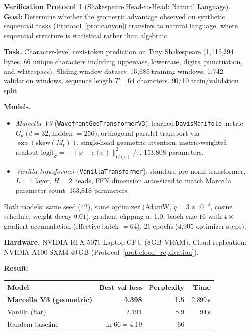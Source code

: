 \documentclass[11pt,a4paper]{article}
\theoremstyle{definition}
\newtheorem{protocol}[theorem]{Verification Protocol}
\theoremstyle{remark}
\begin{document}
\begin{protocol}[Shakespeare Head-to-Head: Natural Language]\label{prot:shakespeare}
\textbf{Goal:} Determine whether the geometric advantage observed on 
synthetic sequential tasks (Protocol~\ref{prot:canyon}) transfers to 
natural language, where sequential structure is statistical rather 
than algebraic.

\textbf{Task.} Character-level next-token prediction on Tiny 
Shakespeare (1{,}115{,}394 bytes, 66 unique characters including 
uppercase, lowercase, digits, punctuation, and whitespace). 
Sliding-window dataset: 15{,}685 training windows, 1{,}742 
validation windows, sequence length $T = 64$ characters. 
90/10 train/validation split.

\textbf{Models.}
\begin{itemize}[nosep]
  \item \emph{Marcella V3} (\texttt{WavefrontGeoTransformerV3}): 
  learned \texttt{DavisManifold} metric $G_\theta$ ($d = 32$, 
  hidden $= 256$), orthogonal parallel transport via 
  $\exp(\mathrm{skew}(M_t))$, single-head geometric attention, 
  metric-weighted readout 
  $\mathrm{logit}_\sigma = -\|x - e(\sigma)\|^2_{G(x)} / \tau$. 
  153{,}808 parameters.
  \item \emph{Vanilla transformer} 
  (\texttt{VanillaTransformer}): standard pre-norm transformer, 
  $L = 1$ layer, $H = 2$ heads, FFN dimension auto-sized to 
  match Marcella parameter count. 153{,}818 parameters.
\end{itemize}
Both models: same seed (42), same optimizer (AdamW, 
$\eta = 3 \times 10^{-4}$, cosine schedule, weight decay $0.01$), 
gradient clipping at 1.0, batch size $16$ with $4\times$ gradient 
accumulation (effective batch $= 64$), 20 epochs (4{,}905 optimizer 
steps).

\textbf{Hardware.} NVIDIA RTX 5070 Laptop GPU (8\,GB VRAM).
Cloud replication: NVIDIA A100-SXM4-40\,GB
(Protocol~\ref{prot:cloud_replication}).

\textbf{Result:}
\begin{center}
\begin{tabular}{lrrr}
\toprule
Model & Best val loss & Perplexity & Time \\
\midrule
\textbf{Marcella V3 (geometric)} & \textbf{0.398} & \textbf{1.5} & 2{,}899\,s \\
Vanilla (flat) & 2.191 & 8.9 & 94\,s \\
Random baseline & $\ln 66 = 4.19$ & 66 & --- \\
\bottomrule
\end{tabular}
\end{center}


\end{protocol}
\end{document}
